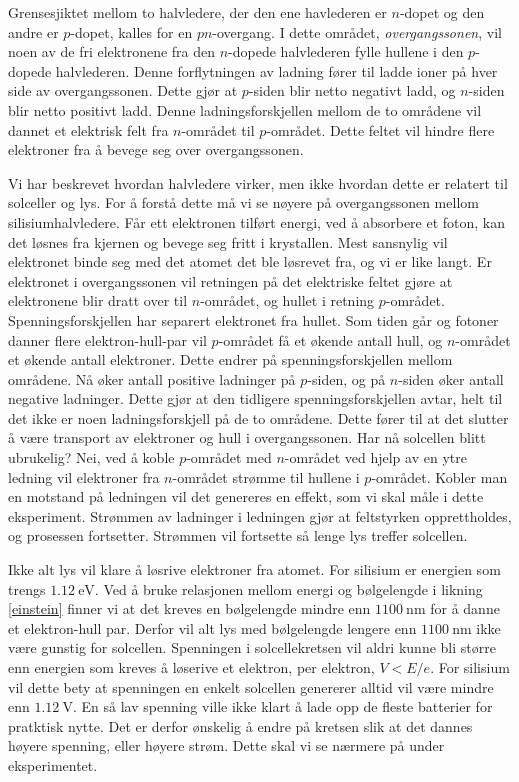 \documentclass[%
 reprint,
 amsmath,amssymb,
 aps,
 norsk,
 booktabs
]{revtex4-1}
\begin{document}
Grensesjiktet mellom to halvledere, der den ene havlederen er $n$-dopet og den andre er $p$-dopet, kalles for en $pn$-overgang. I dette området, \textit{overgangssonen}, vil noen av de fri elektronene fra den $n$-dopede halvlederen fylle hullene i den $p$-dopede halvlederen. Denne forflytningen av ladning fører til ladde ioner på hver side av overgangssonen. Dette gjør at $p$-siden blir netto negativt ladd, og $n$-siden blir netto positivt ladd. Denne ladningsforskjellen mellom de to områdene vil dannet et elektrisk felt fra $n$-området til $p$-området. Dette feltet vil hindre flere elektroner fra å bevege seg over overgangssonen.\par
Vi har beskrevet hvordan halvledere virker, men ikke hvordan dette er relatert til solceller og lys. For å  forstå dette må vi se nøyere på overgangssonen mellom silisiumhalvledere. Får ett elektronen tilført energi, ved å absorbere et foton, kan det løsnes fra kjernen og bevege seg fritt i krystallen. Mest sansnylig vil elektronet binde seg med det atomet det ble løsrevet fra, og vi er like langt. Er elektronet i overgangssonen vil retningen på det elektriske feltet gjøre at elektronene blir dratt over til $n$-området, og hullet i retning $p$-området. Spenningsforskjellen har separert elektronet fra hullet. Som tiden går og fotoner danner flere elektron-hull-par vil $p$-området få et økende antall hull, og $n$-området et økende antall elektroner. Dette endrer på spenningsforskjellen mellom områdene. Nå øker antall positive ladninger på $p$-siden, og på $n$-siden øker antall negative ladninger. Dette gjør at den tidligere spenningsforskjellen avtar, helt til det ikke er noen ladningsforskjell på de to områdene. Dette fører til at det slutter å være transport av elektroner og hull i overgangssonen. Har nå solcellen blitt ubrukelig? Nei, ved å koble $p$-området med $n$-området ved hjelp av en ytre ledning vil elektroner fra $n$-området strømme til hullene i $p$-området. Kobler man en motstand på ledningen vil det genereres en effekt, som vi skal måle i dette eksperiment. Strømmen av ladninger i ledningen gjør at feltstyrken opprettholdes, og prosessen fortsetter. Strømmen vil fortsette så lenge lys treffer solcellen.\par
Ikke alt lys vil klare å løsrive elektroner fra atomet. For silisium er energien som trengs $\SI{1.12}{\electronvolt}$. Ved å bruke relasjonen mellom energi og bølgelengde i likning \eqref{einstein} finner vi at det kreves en bølgelengde mindre enn $\SI{1100}{\nano\meter}$ for å danne et elektron-hull par. Derfor vil alt lys med bølgelengde lengere enn $\SI{1100}{\nano\meter}$ ikke være gunstig for solcellen. Spenningen i solcellekretsen vil aldri kunne bli større enn energien som kreves å løserive et elektron, per elektron, $V<E/e$. For silisium vil dette bety at spenningen en enkelt solcellen genererer alltid vil være mindre enn $\SI{1.12}{\volt}$. En så lav spenning ville ikke klart å lade opp de fleste batterier for pratktisk nytte. Det er derfor ønskelig å endre på kretsen slik at det dannes høyere spenning, eller høyere strøm. Dette skal vi se nærmere på under eksperimentet.
\end{document}
